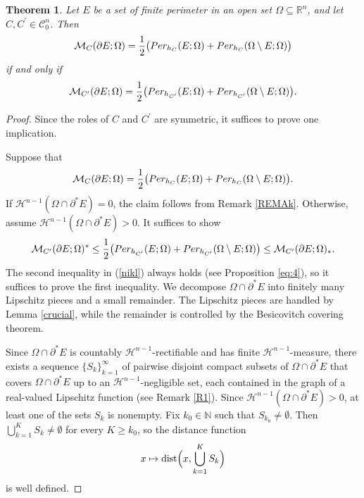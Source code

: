 \documentclass[10pt,a4paper]{amsart}
\newtheorem{theorem}{Theorem}
\DeclareMathOperator{\dist}{\textup{dist}}
\begin{document}
\begin{theorem}
\label{theoremExistence}
Let $E$ be a set of finite perimeter in an open set $\Omega\subseteq\mathbb{R}^n$, and let $C, C^{\prime}\in\mathcal{C}^n_0$. Then
\[
\mathcal{M}_C(\partial E; \Omega)=\frac{1}{2}\big(\textup{Per}_{h_{C}}(E; \Omega)+\textup{Per}_{h_{C}}(\Omega\setminus E; \Omega)\big)
\]
if and only if
\[
\mathcal{M}_{C^{\prime}}(\partial E; \Omega)=\frac{1}{2}\big(\textup{Per}_{h_{C^{\prime}}}(E; \Omega)+\textup{Per}_{h_{C^{\prime}}}(\Omega\setminus E; \Omega)\big). 
\]
\end{theorem}

\begin{proof}
Since the roles of $C$ and $C^{\prime}$ are symmetric, it suffices to prove one implication.

Suppose that
\[
\mathcal{M}_C(\partial E; \Omega)=\frac{1}{2}\big(\textup{Per}_{h_{C}}(E; \Omega)+\textup{Per}_{h_{C}}(\Omega\setminus E; \Omega)\big).
\]
If $\mathcal{H}^{n-1}(\Omega\cap\partial^*E)=0$, the claim follows from Remark \ref{REMAk}. Otherwise, assume $\mathcal{H}^{n-1}(\Omega\cap\partial^*E)>0$. It suffices to show
\begin{align}\label{nikl}
\mathcal{M}_{C^{\prime}}(\partial E; \Omega)^*\leq\frac{1}{2}\big(\textup{Per}_{h_{C^{\prime}}}(E; \Omega)+\textup{Per}_{h_{C^{\prime}}}(\Omega\setminus E; \Omega)\big)\leq \mathcal{M}_{C^{\prime}}(\partial E; \Omega)_*.
\end{align}
The second inequality in (\ref{nikl}) always holds (see Proposition \ref{eq:4}), so it suffices to prove the first inequality. We decompose $\Omega\cap\partial^*E$ into finitely many Lipschitz pieces and a small remainder. The Lipschitz pieces are handled by Lemma \ref{crucial}, while the remainder is controlled by the Besicovitch covering theorem.

Since $\Omega\cap\partial^* E$ is countably $\mathcal{H}^{n-1}$-rectifiable and has finite $\mathcal{H}^{n-1}$-measure, there exists a sequence $\{S_k\}_{k=1}^{\infty}$ of pairwise disjoint compact subsets of $\Omega\cap\partial^* E$ that covers $\Omega\cap\partial^* E$ up to an $\mathcal{H}^{n-1}$-negligible set, each contained in the graph of a real-valued Lipschitz function (see Remark \ref{R1}). Since $\mathcal{H}^{n-1}(\Omega\cap\partial^* E)>0$, at least one of the sets $S_k$ is nonempty. Fix $k_0\in\mathbb{N}$ such that $S_{k_0}\neq\emptyset$. Then $\bigcup_{k=1}^K S_k\neq\emptyset$ for every $K\geq k_0$, so the distance function
\[
x\mapsto \dist\Bigl(x,\bigcup_{k=1}^K S_k\Bigr)
\]
is well defined.


\end{proof}
\end{document}

